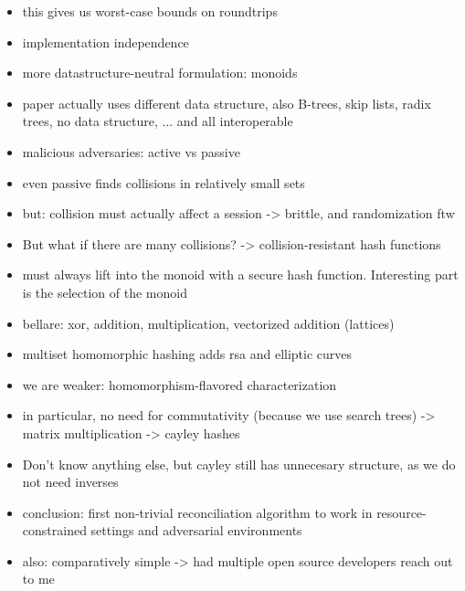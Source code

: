 \documentclass{beamer}
\begin{document}
\begin{itemize}
    \item this gives us worst-case bounds on roundtrips
    \item implementation independence
    \item more datastructure-neutral formulation: monoids
    \item paper actually uses different data structure, also B-trees, skip lists, radix trees, no data structure, ... and all interoperable
\end{itemize}

\begin{itemize}
    \item malicious adversaries: active vs passive
    \item even passive finds collisions in relatively small sets
    \item but: collision must actually affect a session -> brittle, and randomization ftw
    \item But what if there are many collisions? -> collision-resistant hash functions
\end{itemize}

\begin{itemize}
    \item must always lift into the monoid with a secure hash function. Interesting part is the selection of the monoid
    \item bellare: xor, addition, multiplication, vectorized addition (lattices)
    \item multiset homomorphic hashing adds rsa and elliptic curves
    \item we are weaker: homomorphism-flavored characterization
    \item in particular, no need for commutativity (because we use search trees) -> matrix multiplication -> cayley hashes
    \item Don't know anything else, but cayley still has unnecesary structure, as we do not need inverses
\end{itemize}

\begin{itemize}
    \item conclusion: first non-trivial reconciliation algorithm to work in resource-constrained settings and adversarial environments
    \item also: comparatively simple -> had multiple open source developers reach out to me
\end{itemize}
\end{document}
